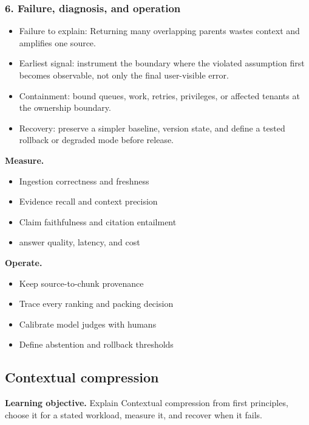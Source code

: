 \subsubsection*{6. Failure, diagnosis, and operation}
\begin{itemize}
\item Failure to explain: Returning many overlapping parents wastes context and amplifies one source.
\item Earliest signal: instrument the boundary where the violated assumption first becomes observable, not only the final user-visible error.
\item Containment: bound queues, work, retries, privileges, or affected tenants at the ownership boundary.
\item Recovery: preserve a simpler baseline, version state, and define a tested rollback or degraded mode before release.
\end{itemize}
\textbf{Measure.}\begin{itemize}
\item Ingestion correctness and freshness
\item Evidence recall and context precision
\item Claim faithfulness and citation entailment
\item answer quality, latency, and cost
\end{itemize}
\textbf{Operate.}\begin{itemize}
\item Keep source-to-chunk provenance
\item Trace every ranking and packing decision
\item Calibrate model judges with humans
\item Define abstention and rollback thresholds
\end{itemize}
\subsection{Contextual compression}
\textbf{Learning objective.} Explain Contextual compression from first principles, choose it for a stated workload, measure it, and recover when it fails.
